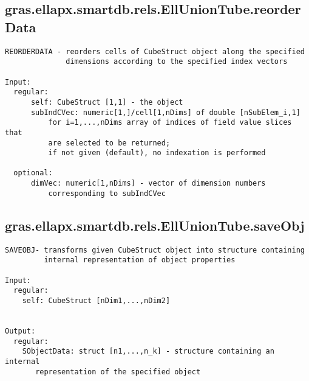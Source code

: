 \subsection{\texorpdfstring{gras.ellapx.smartdb.rels.EllUnionTube.reorderData}{reorderData}}\label{method:gras.ellapx.smartdb.rels.EllUnionTube.reorderData}
\begin{verbatim}
REORDERDATA - reorders cells of CubeStruct object along the specified
              dimensions according to the specified index vectors

Input:
  regular:
      self: CubeStruct [1,1] - the object
      subIndCVec: numeric[1,]/cell[1,nDims] of double [nSubElem_i,1]
          for i=1,...,nDims array of indices of field value slices that
          are selected to be returned;
          if not given (default), no indexation is performed

  optional:
      dimVec: numeric[1,nDims] - vector of dimension numbers
          corresponding to subIndCVec
\end{verbatim}
\subsection{\texorpdfstring{gras.ellapx.smartdb.rels.EllUnionTube.saveObj}{saveObj}}\label{method:gras.ellapx.smartdb.rels.EllUnionTube.saveObj}
\begin{verbatim}
SAVEOBJ- transforms given CubeStruct object into structure containing
         internal representation of object properties

Input:
  regular:
    self: CubeStruct [nDim1,...,nDim2]


Output:
  regular:
    SObjectData: struct [n1,...,n_k] - structure containing an internal
       representation of the specified object
\end{verbatim}
